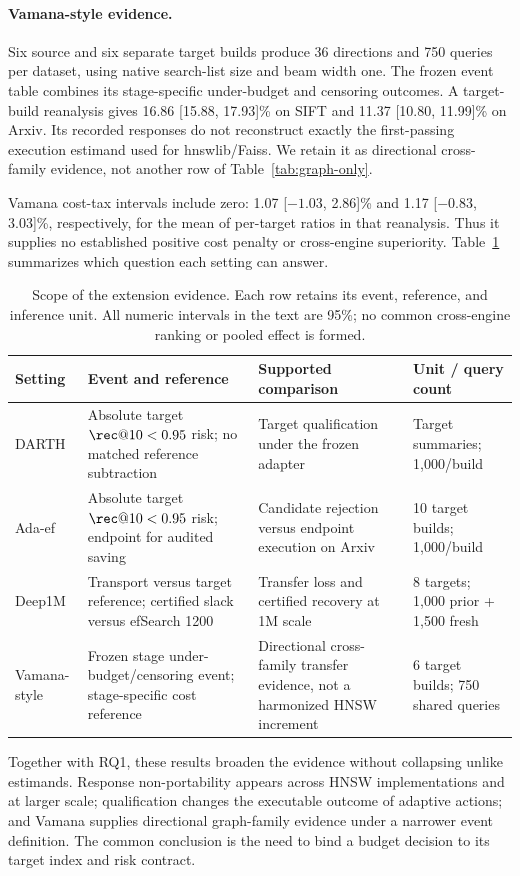\paragraph{Vamana-style evidence.}
Six source and six separate target builds produce 36 directions and 750 queries per dataset, using native search-list size and beam width one. The frozen event table combines its stage-specific under-budget and censoring outcomes. A target-build reanalysis gives 16.86 [15.88, 17.93]\% on SIFT and 11.37 [10.80, 11.99]\% on Arxiv. Its recorded responses do not reconstruct exactly the first-passing execution estimand used for hnswlib/Faiss. We retain it as directional cross-family evidence, not another row of Table~\ref{tab:graph-only}.

Vamana cost-tax intervals include zero: 1.07 [$-1.03$, 2.86]\% and 1.17 [$-0.83$, 3.03]\%, respectively, for the mean of per-target ratios in that reanalysis. Thus it supplies no established positive cost penalty or cross-engine superiority. Table~\ref{tab:scope} summarizes which question each setting can answer.

\begin{table}[t]
\caption{Scope of the extension evidence. Each row retains its event, reference, and inference unit. All numeric intervals in the text are 95\%; no common cross-engine ranking or pooled effect is formed.}
\label{tab:scope}
\small\begin{tabularx}{\textwidth}{@{}lXXl@{}}\toprule
Setting & Event and reference & Supported comparison & Unit / query count\\\midrule
DARTH & Absolute target $\rec@10<0.95$ risk; no matched reference subtraction & Target qualification under the frozen adapter & Target summaries; 1,000/build\\
Ada-ef & Absolute target $\rec@10<0.95$ risk; endpoint for audited saving & Candidate rejection versus endpoint execution on Arxiv & 10 target builds; 1,000/build\\
Deep1M & Transport versus target reference; certified slack versus efSearch 1200 & Transfer loss and certified recovery at 1M scale & 8 targets; 1,000 prior + 1,500 fresh\\
Vamana-style & Frozen stage under-budget/censoring event; stage-specific cost reference & Directional cross-family transfer evidence, not a harmonized HNSW increment & 6 target builds; 750 shared queries\\\bottomrule
\end{tabularx}
\end{table}

Together with RQ1, these results broaden the evidence without collapsing unlike estimands. Response non-portability appears across HNSW implementations and at larger scale; qualification changes the executable outcome of adaptive actions; and Vamana supplies directional graph-family evidence under a narrower event definition. The common conclusion is the need to bind a budget decision to its target index and risk contract.
